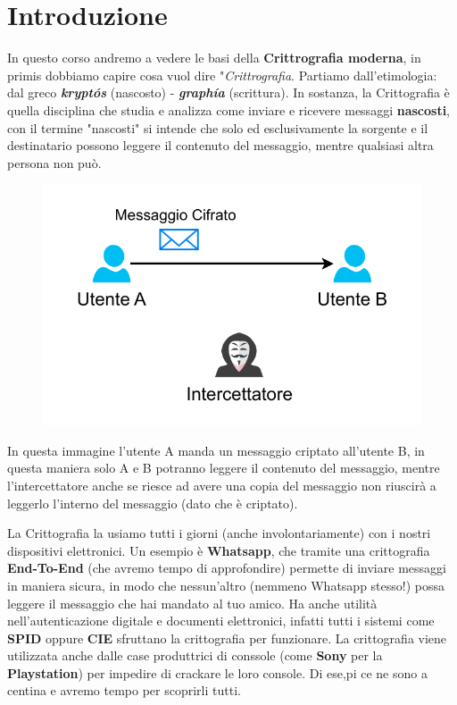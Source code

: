 \documentclass{report}
\begin{document}
\section{Introduzione}

In questo corso andremo a vedere le basi della \textbf{Crittrografia moderna}, in primis dobbiamo capire cosa vuol dire "\textit{Crittrografia}. Partiamo dall'etimologia: dal greco \textbf{\textit{kryptós}} (nascosto) - \textbf{\textit{graphía}} (scrittura). In sostanza, la Crittografia è quella disciplina che studia e analizza come inviare e ricevere messaggi \textbf{nascosti}, con il termine "nascosti" si intende che solo ed esclusivamente la sorgente e il destinatario possono leggere il contenuto del messaggio, mentre qualsiasi altra persona non può. 

\begin{figure}[h]
     \centering
    \includegraphics[width=0.6\linewidth]{logos/cripto1.pdf}
\end{figure}

In questa immagine l'utente A manda un messaggio criptato all'utente B, in questa maniera solo A e B potranno leggere il contenuto del messaggio, mentre l'intercettatore anche se riesce ad avere una copia del messaggio non riuscirà a leggerlo l'interno del messaggio (dato che è criptato).


La Crittografia la usiamo tutti i giorni (anche involontariamente) con i nostri dispositivi elettronici. Un esempio è \textbf{Whatsapp}, che tramite una crittografia \textbf{End-To-End} (che avremo tempo di approfondire) permette di inviare messaggi in maniera sicura, in modo che nessun'altro (nemmeno Whatsapp stesso!) possa leggere il messaggio che hai mandato al tuo amico. Ha anche utilità nell'autenticazione digitale e documenti elettronici, infatti tutti i sistemi come \textbf{SPID} oppure \textbf{CIE} sfruttano la crittografia per funzionare. La crittografia viene utilizzata anche dalle case produttrici di conssole (come \textbf{Sony} per la \textbf{Playstation}) per impedire di crackare le loro console. Di ese,pi ce ne sono a centina e avremo tempo per scoprirli tutti. 
\end{document}
